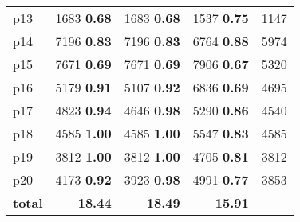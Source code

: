 \begin{tabular}{lrrrr}
\multicolumn{1}{l|}{p13} & {\footnotesize 1683} \textbf{0.68} & {\footnotesize 1683} \textbf{0.68} & {\footnotesize 1537} \textbf{0.75} & \multicolumn{1}{|r}{1147}\\
\multicolumn{1}{l|}{p14} & {\footnotesize 7196} \textbf{0.83} & {\footnotesize 7196} \textbf{0.83} & {\footnotesize 6764} \textbf{0.88} & \multicolumn{1}{|r}{5974}\\
\multicolumn{1}{l|}{p15} & {\footnotesize 7671} \textbf{0.69} & {\footnotesize 7671} \textbf{0.69} & {\footnotesize 7906} \textbf{0.67} & \multicolumn{1}{|r}{5320}\\
\multicolumn{1}{l|}{p16} & {\footnotesize 5179} \textbf{0.91} & {\footnotesize 5107} \textbf{0.92} & {\footnotesize 6836} \textbf{0.69} & \multicolumn{1}{|r}{4695}\\
\multicolumn{1}{l|}{p17} & {\footnotesize 4823} \textbf{0.94} & {\footnotesize 4646} \textbf{0.98} & {\footnotesize 5290} \textbf{0.86} & \multicolumn{1}{|r}{4540}\\
\multicolumn{1}{l|}{p18} & {\footnotesize 4585} \textbf{1.00} & {\footnotesize 4585} \textbf{1.00} & {\footnotesize 5547} \textbf{0.83} & \multicolumn{1}{|r}{4585}\\
\multicolumn{1}{l|}{p19} & {\footnotesize 3812} \textbf{1.00} & {\footnotesize 3812} \textbf{1.00} & {\footnotesize 4705} \textbf{0.81} & \multicolumn{1}{|r}{3812}\\
\multicolumn{1}{l|}{p20} & {\footnotesize 4173} \textbf{0.92} & {\footnotesize 3923} \textbf{0.98} & {\footnotesize 4991} \textbf{0.77} & \multicolumn{1}{|r}{3853}\\
\midrule
\textbf{total} & \textbf{18.44} & \textbf{18.49} & \textbf{15.91} & \\
\bottomrule
\end{tabular}

